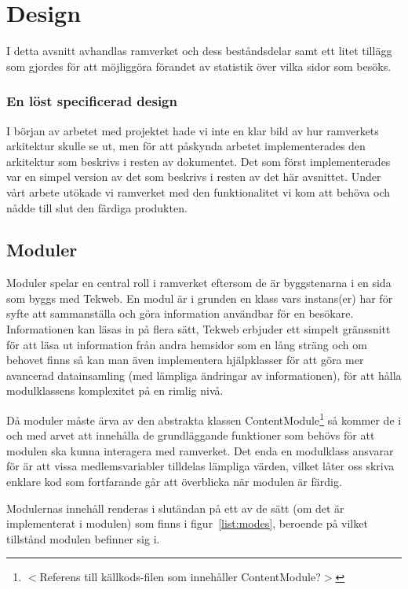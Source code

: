 \section{Design}
I detta avsnitt avhandlas ramverket och dess beståndsdelar samt ett litet
tillägg som gjordes för att möjliggöra förandet av statistik över vilka sidor
som besöks.

\subsubsection*{En löst specificerad design}
I början av arbetet med projektet hade vi inte en klar bild av hur ramverkets
arkitektur skulle se ut, men för att påskynda arbetet implementerades den
arkitektur som beskrivs i resten av dokumentet. Det som först implementerades
var en simpel version av det som beskrivs i resten av det här avsnittet. Under
vårt arbete utökade vi ramverket med den funktionalitet vi kom att behöva och
nådde till slut den färdiga produkten.

\subsection{Moduler}
Moduler spelar en central roll i ramverket eftersom de är byggstenarna i en sida
som byggs med Tekweb. En modul är i grunden en klass vars instans(er) har
för syfte att sammanställa och göra information användbar för en besökare.
Informationen kan läsas in på flera sätt, Tekweb erbjuder ett simpelt gränssnitt
för att läsa ut information från andra hemsidor som en lång sträng och om
behovet finns så kan man även implementera hjälpklasser för att göra mer
avancerad datainsamling (med lämpliga ändringar av informationen), för att
hålla modulklassens komplexitet på en rimlig nivå.

Då moduler måste ärva av den abstrakta klassen ContentModule\footnote{
$<$Referens till källkods-filen som innehåller ContentModule?$>$} så kommer de
i och med arvet att innehålla de grundläggande funktioner som behövs för att
modulen ska kunna interagera med ramverket. Det enda en
modulklass ansvarar för är att vissa medlemsvariabler tilldelas lämpliga
värden, vilket låter oss skriva enklare kod som fortfarande går att överblicka
när modulen är färdig.

Modulernas innehåll renderas i slutändan på ett av de sätt (om det är
implementerat i modulen) som finns i figur~\ref{list:modes}, beroende på vilket
tillstånd modulen befinner sig i.


